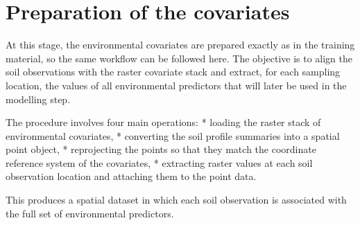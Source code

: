 \documentclass[
  10pt,
  b5paper,
  oneside]{book}
\begin{document}
\section{Preparation of the covariates}\label{preparation-of-the-covariates}

At this stage, the environmental covariates are prepared exactly as in the training material, so the same workflow can be followed here. The objective is to align the soil observations with the raster covariate stack and extract, for each sampling location, the values of all environmental predictors that will later be used in the modelling step.

The procedure involves four main operations:
* loading the raster stack of environmental covariates,
* converting the soil profile summaries into a spatial point object,
* reprojecting the points so that they match the coordinate reference system of the covariates,
* extracting raster values at each soil observation location and attaching them to the point data.

This produces a spatial dataset in which each soil observation is associated with the full set of environmental predictors.
\end{document}
